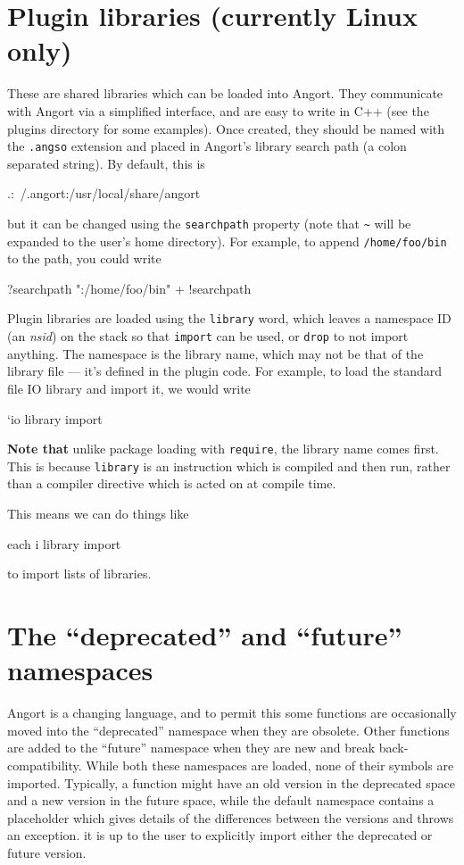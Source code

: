 \section{Plugin libraries (currently Linux only)}
\label{library}
These are shared libraries which can be loaded into Angort. They communicate
with Angort via a simplified interface, and are easy to write in C++ (see
the plugins directory for some examples). 
Once created, they should be named with the \texttt{.angso} extension
and placed in Angort's library search path (a colon separated string).
By default, this is 
\begin{v}
.:~/.angort:/usr/local/share/angort
\end{v}
but it can be changed using the 
\texttt{searchpath} property (note that \verb+~+ will be expanded
to the user's home directory). For example, to append \texttt{/home/foo/bin}
to the path, you could write
\begin{v}
?searchpath ":/home/foo/bin" + !searchpath
\end{v}
Plugin libraries are loaded using the \texttt{library} word, which
leaves a namespace ID (an \emph{nsid}) on the stack so that \texttt{import} can be
used, or \texttt{drop} to not import anything. The namespace is
the library name, which may not be that of the library file --- it's defined
in the plugin code. For example, to load the standard file IO library
and import it, we would write
\begin{v}
`io library import
\end{v}
\textbf{Note that} unlike package loading with \texttt{require},
the library name comes first.
This is because \texttt{library} is an instruction which is compiled and
then run, rather than a compiler directive which is acted on
at compile time.

This means we can do things like
\begin{v}
[`id3, `mpc, `io] each {i library import}
\end{v}
to import lists of libraries.

\section{The ``deprecated'' and ``future'' namespaces}
\label{futdep}
Angort is a changing language, and to permit this some functions are
occasionally moved into the ``deprecated'' namespace when they are obsolete.
Other functions are added to the ``future'' namespace when they are new
and break back-compatibility. 
While both these namespaces are loaded, none of their symbols are imported. 
Typically, a function might have an
old version in the deprecated space and a new version in the future space,
while the default namespace contains a placeholder which gives details
of the differences between the versions and throws an exception.
it is up to the user to explicitly import either the deprecated or
future version.

